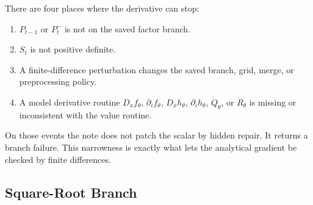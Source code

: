 \documentclass[11pt]{article}
\numberwithin{equation}{section}
\begin{document}
There are four places where the derivative can stop:
\begin{enumerate}[leftmargin=0.24in]
\item \(P_{t-1}\) or \(P_t^-\) is not on the saved factor branch.
\item \(S_t\) is not positive definite.
\item A finite-difference perturbation changes the saved branch, grid, merge,
or preprocessing policy.
\item A model derivative routine \(D_xf_\theta\), \(\partial_i f_\theta\),
\(D_xh_\theta\), \(\partial_i h_\theta\), \(\dot Q_\theta\), or
\(\dot R_\theta\) is missing or inconsistent with the value routine.
\end{enumerate}
On those events the note does not patch the scalar by hidden repair.  It
returns a branch failure.  This narrowness is exactly what lets the analytical
gradient be checked by finite differences.

\subsection{Square-Root Branch}
\end{document}
